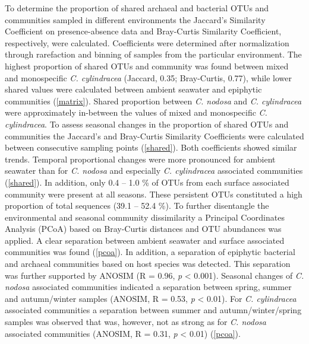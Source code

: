 \documentclass[12pt,]{article}
\begin{document}
To determine the proportion of shared archaeal and bacterial OTUs and
communities sampled in different environments the Jaccard's Similarity
Coefficient on presence-absence data and Bray-Curtis Similarity
Coefficient, respectively, were calculated. Coefficients were determined
after normalization through rarefaction and binning of samples from the
particular environment. The highest proportion of shared OTUs and
community was found between mixed and monospecific \emph{C. cylindracea}
(Jaccard, 0.35; Bray-Curtis, 0.77), while lower shared values were
calculated between ambient seawater and epiphytic communities
(\autoref{matrix}). Shared proportion between \emph{C. nodosa} and
\emph{C. cylindracea} were approximately in-between the values of mixed
and monospecific \emph{C. cylindracea}. To assess seasonal changes in
the proportion of shared OTUs and communities the Jaccard's and
Bray-Curtis Similarity Coefficients were calculated between consecutive
sampling points (\autoref{shared}). Both coefficients showed similar
trends. Temporal proportional changes were more pronounced for ambient
seawater than for \emph{C. nodosa} and especially \emph{C. cylindracea}
associated communities (\autoref{shared}). In addition, only 0.4 -- 1.0
\si{\percent} of OTUs from each surface associated community were
present at all seasons. These persistent OTUs constituted a high
proportion of total sequences (39.1 -- 52.4 \si{\percent}). To further
disentangle the environmental and seasonal community dissimilarity a
Principal Coordinates Analysis (PCoA) based on Bray-Curtis distances and
OTU abundances was applied. A clear separation between ambient seawater
and surface associated communities was found (\autoref{pcoa}). In
addition, a separation of epiphytic bacterial and archaeal communities
based on host species was detected. This separation was further
supported by ANOSIM (R = 0.96, \emph{p} \textless{} 0.001). Seasonal
changes of \emph{C. nodosa} associated communities indicated a
separation between spring, summer and autumn/winter samples (ANOSIM, R =
0.53, \emph{p} \textless{} 0.01). For \emph{C. cylindracea} associated
communities a separation between summer and autumn/winter/spring samples
was observed that was, however, not as strong as for \emph{C. nodosa}
associated communities (ANOSIM, R = 0.31, \emph{p} \textless{} 0.01)
(\autoref{pcoa}).
\end{document}
